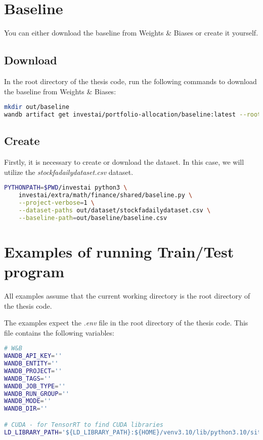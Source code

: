 \documentclass[../xlapes02]{subfiles}
\begin{document}
    \section{Baseline}
    You can either download the baseline from Weights \& Biases or create it yourself.

    \subsection{Download}
    In the root directory of the thesis code, run the following commands to download the baseline from Weights \& Biases:
    \begin{lstlisting}[language=bash]
mkdir out/baseline
wandb artifact get investai/portfolio-allocation/baseline:latest --root out/baseline
    \end{lstlisting}

    \subsection{Create}
    Firstly, it is necessary to create or download the dataset. In this case, we will utilize the \emph{stockfadailydataset.csv} dataset.
    \begin{lstlisting}[language=bash]
PYTHONPATH=$PWD/investai python3 \
    investai/extra/math/finance/shared/baseline.py \
    --project-verbose=1 \
    --dataset-paths out/dataset/stockfadailydataset.csv \
    --baseline-path=out/baseline/baseline.csv
    \end{lstlisting}


    \section{Examples of running Train/Test program}
    All examples assume that the current working directory is the root directory of the thesis code.

    The examples expect the \emph{.env} file in the root directory of the thesis code. This file contains the following variables:
    \begin{lstlisting}[language=bash]
# W&B
WANDB_API_KEY=''
WANDB_ENTITY=''
WANDB_PROJECT=''
WANDB_TAGS=''
WANDB_JOB_TYPE=''
WANDB_RUN_GROUP=''
WANDB_MODE=''
WANDB_DIR=''

# CUDA - for TensorRT to find CUDA libraries
LD_LIBRARY_PATH='${LD_LIBRARY_PATH}:${HOME}/venv3.10/lib/python3.10/site-packages/nvidia/cuda_runtime/lib/:${HOME}/venv3.10/lib/python3.10/site-packages/tensorrt/'
    \end{lstlisting}
\end{document}
